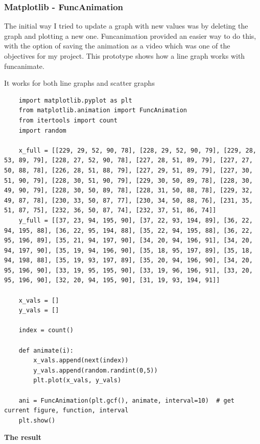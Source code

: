 \documentclass[11pt, a4paper]{article}
\begin{document}
\subsubsection{Matplotlib - FuncAnimation}
The initial way I tried to update a graph with new values was by deleting the graph and plotting a new one. Funcanimation provided an easier way to do this, with the option of saving the animation as a video which was one of the objectives for my project. This prototype shows how a line graph works with funcanimate.

It works for both line graphs and scatter graphs
\begin{lstlisting}
    import matplotlib.pyplot as plt
    from matplotlib.animation import FuncAnimation
    from itertools import count
    import random
    
    x_full = [[229, 29, 52, 90, 78], [228, 29, 52, 90, 79], [229, 28, 53, 89, 79], [228, 27, 52, 90, 78], [227, 28, 51, 89, 79], [227, 27, 50, 88, 78], [226, 28, 51, 88, 79], [227, 29, 51, 89, 79], [227, 30, 51, 90, 79], [228, 30, 51, 90, 79], [229, 30, 50, 89, 78], [228, 30, 49, 90, 79], [228, 30, 50, 89, 78], [228, 31, 50, 88, 78], [229, 32, 49, 87, 78], [230, 33, 50, 87, 77], [230, 34, 50, 88, 76], [231, 35, 51, 87, 75], [232, 36, 50, 87, 74], [232, 37, 51, 86, 74]]
    y_full = [[37, 23, 94, 195, 90], [37, 22, 93, 194, 89], [36, 22, 94, 195, 88], [36, 22, 95, 194, 88], [35, 22, 94, 195, 88], [36, 22, 95, 196, 89], [35, 21, 94, 197, 90], [34, 20, 94, 196, 91], [34, 20, 94, 197, 90], [35, 19, 94, 196, 90], [35, 18, 95, 197, 89], [35, 18, 94, 198, 88], [35, 19, 93, 197, 89], [35, 20, 94, 196, 90], [34, 20, 95, 196, 90], [33, 19, 95, 195, 90], [33, 19, 96, 196, 91], [33, 20, 95, 196, 90], [32, 20, 94, 195, 90], [31, 19, 93, 194, 91]]
    
    x_vals = []
    y_vals = []
    
    index = count()
    
    def animate(i):
        x_vals.append(next(index))
        y_vals.append(random.randint(0,5))
        plt.plot(x_vals, y_vals)
    
    ani = FuncAnimation(plt.gcf(), animate, interval=10)  # get current figure, function, interval
    plt.show()
\end{lstlisting}

\textbf{The result}
\end{document}
